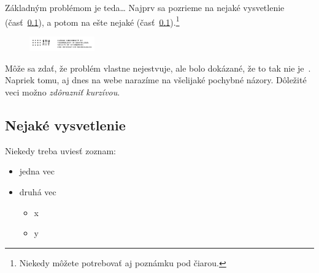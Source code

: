 \documentclass[10pt,twocolumn,twoside,slovak,a4paper]{article}
\begin{document}


Základným problémom je teda\ldots{} Najprv sa pozrieme na nejaké vysvetlenie (časť~\ref{ina:nejake}), a potom na ešte nejaké (časť~\ref{ina:nejake}).\footnote{Niekedy môžete potrebovať aj poznámku pod čiarou.}
\begin{figure}
	\centering
	\includegraphics[width=0.25\textwidth]{fiit/PNG/STU-FIIT-anch.png}
\end{figure}

Môže sa zdať, že problém vlastne nejestvuje\cite{Coplien:MPD}, ale bolo dokázané, že to tak nie je~\cite{Czarnecki:Staged, Czarnecki:Progress}. Napriek tomu, aj dnes na webe narazíme na všelijaké pochybné názory\cite{PLP-Framework}. Dôležité veci možno \emph{zdôrazniť kurzívou}.


\subsection{Nejaké vysvetlenie} \label{ina:nejake}

Niekedy treba uviesť zoznam:

\begin{itemize}
	\item jedna vec
	\item druhá vec
	      \begin{itemize}
		      \item x
		      \item y
	      \end{itemize}
\end{itemize}
\end{document}
